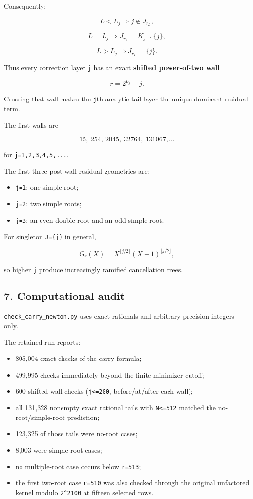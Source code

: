 \documentclass[11pt,letterpaper]{article}
\providecommand{\tightlist}{\setlength{\itemsep}{0pt}\setlength{\parskip}{0pt}}
\begin{document}
Consequently:

\[
\boxed{
L<L_j\Rightarrow j\notin J_{r_L},
}
\]

\[
\boxed{
L=L_j\Rightarrow J_{r_L}=K_j\cup\{j\},
}
\]

\[
\boxed{
L>L_j\Rightarrow J_{r_L}=\{j\}.
}
\]

Thus every correction layer \texttt{j} has an exact \textbf{shifted power-of-two wall}

\[
\boxed{r=2^{L_j}-j.}
\]

Crossing that wall makes the \texttt{j}th analytic tail layer the unique dominant residual term.

The first walls are

\[
15,\ 254,\ 2045,\ 32764,\ 131067,\ldots
\]

for \texttt{j=1,2,3,4,5,...}.

The first three post-wall residual geometries are:

\begin{itemize}
\tightlist
\item
  \texttt{j=1}: one simple root;
\item
  \texttt{j=2}: two simple roots;
\item
  \texttt{j=3}: an even double root and an odd simple root.
\end{itemize}

For singleton \texttt{J=\{j\}} in general,

\[
\overline G_r(X)
=X^{\lceil j/2\rceil}(X+1)^{\lfloor j/2\rfloor},
\]

so higher \texttt{j} produce increasingly ramified cancellation trees.

\subsection{7. Computational audit}\label{computational-audit}

\texttt{check\_carry\_newton.py} uses exact rationals and arbitrary-precision integers only.

The retained run reports:

\begin{itemize}
\tightlist
\item
  805,004 exact checks of the carry formula;
\item
  499,995 checks immediately beyond the finite minimizer cutoff;
\item
  600 shifted-wall checks (\texttt{j\textless{}=200}, before/at/after each wall);
\item
  all 131,328 nonempty exact rational tails with \texttt{N\textless{}=512} matched the no-root/simple-root prediction;
\item
  123,325 of those tails were no-root cases;
\item
  8,003 were simple-root cases;
\item
  no multiple-root case occurs below \texttt{r=513};
\item
  the first two-root case \texttt{r=510} was also checked through the original unfactored kernel modulo \texttt{2\^{}2100} at fifteen selected rows.
\end{itemize}
\end{document}
